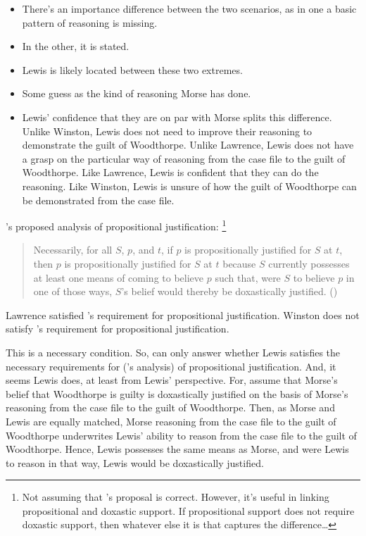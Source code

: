 \documentclass[10pt]{article}
\begin{document}
\begin{itemize}
\item There's an importance difference between the two scenarios, as in one a basic pattern of reasoning is missing.
\item In the other, it is stated.
\item Lewis is likely located between these two extremes.
\item Some guess as the kind of reasoning Morse has done.
\item Lewis' confidence that they are on par with Morse splits this difference.
  Unlike Winston, Lewis does not need to improve their reasoning to demonstrate the guilt of Woodthorpe.
  Unlike Lawrence, Lewis does not have a grasp on the particular way of reasoning from the case file to the guilt of Woodthorpe.
  Like Lawrence, Lewis is confident that they can do the reasoning.
  Like Winston, Lewis is unsure of how the guilt of Woodthorpe can be demonstrated from the case file.
\end{itemize}

\citeauthor{Turri:2010aa}'s proposed analysis of propositional justification:\nolinebreak
\footnote{Not assuming that \citeauthor{Turri:2010aa}'s proposal is correct.
  However, it's useful in linking propositional and doxastic support.
  If propositional support does not require doxastic support, then whatever else it is that captures the difference\dots
}

\begin{quote}
  Necessarily, for all \(S\), \(p\), and \(t\), if \(p\) is propositionally justified for \(S\) at \(t\), then \(p\) is propositionally justified for \(S\) at \(t\) because \(S\) currently possesses at least one means of coming to believe \(p\) such that, were \(S\) to believe \(p\) in one of those ways, \(S\)'s belief would thereby be doxastically justified.\nolinebreak
  \mbox{}\hfill\mbox{(\citeyear[320]{Turri:2010aa})}
\end{quote}

Lawrence satisfied \citeauthor{Turri:2010aa}'s requirement for propositional justification.
Winston does not satisfy \citeauthor{Turri:2010aa}'s requirement for propositional justification.


This is a necessary condition.
So, can only answer whether Lewis satisfies the necessary requirements for (\citeauthor{Turri:2010aa}'s analysis) of propositional justification.
And, it seems Lewis does, at least from Lewis' perspective.
For, assume that Morse's belief that Woodthorpe is guilty is doxastically justified on the basis of Morse's reasoning from the case file to the guilt of Woodthorpe.
Then, as Morse and Lewis are equally matched, Morse reasoning from the case file to the guilt of Woodthorpe underwrites Lewis' ability to reason from the case file to the guilt of Woodthorpe.
Hence, Lewis possesses the same means as Morse, and were Lewis to reason in that way, Lewis would be doxastically justified.
\end{document}
